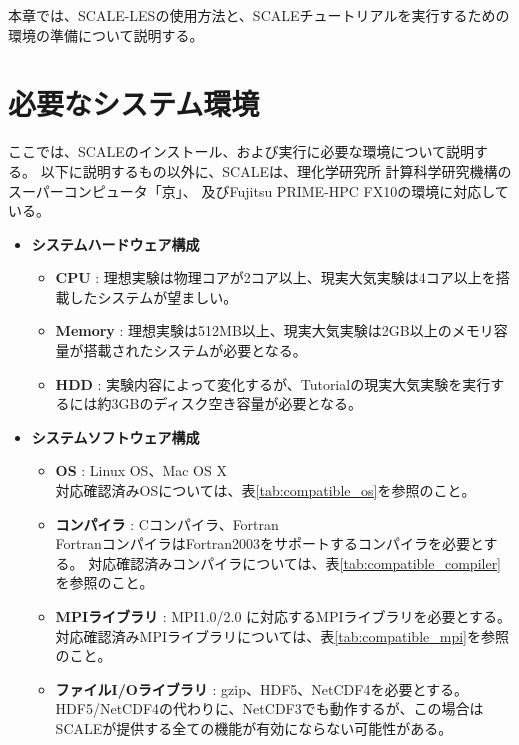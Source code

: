 本章では、SCALE-LESの使用方法と、SCALEチュートリアルを実行するための環境の準備について説明する。

\section{必要なシステム環境}
\label{sec:req_env}
ここでは、SCALEのインストール、および実行に必要な環境について説明する。
以下に説明するもの以外に、SCALEは、理化学研究所 計算科学研究機構のスーパーコンピュータ「京」、
及びFujitsu PRIME-HPC FX10の環境に対応している。

\begin{itemize}
  \item {\bf システムハードウェア構成}
  \begin{itemize}
    \item {\bf CPU} : 理想実験は物理コアが2コア以上、現実大気実験は4コア以上を搭載したシステムが望ましい。
    \item {\bf Memory} : 理想実験は512MB以上、現実大気実験は2GB以上のメモリ容量が搭載されたシステムが必要となる。
    \item {\bf HDD} : 実験内容によって変化するが、Tutorialの現実大気実験を実行するには約3GBのディスク空き容量が必要となる。
  \end{itemize}

  \item {\bf システムソフトウェア構成}
  \begin{itemize}
  \item {\bf OS} : Linux OS、Mac OS X\\
        対応確認済みOSについては、表\ref{tab:compatible_os}を参照のこと。
  \item {\bf コンパイラ} : Cコンパイラ、Fortran\\
        FortranコンパイラはFortran2003をサポートするコンパイラを必要とする。
        対応確認済みコンパイラについては、表\ref{tab:compatible_compiler}を参照のこと。
  \item {\bf MPIライブラリ} : MPI1.0/2.0 に対応するMPIライブラリを必要とする。
        対応確認済みMPIライブラリについては、表\ref{tab:compatible_mpi}を参照のこと。
  \item {\bf ファイルI/Oライブラリ} : gzip、HDF5、NetCDF4を必要とする。\\
        HDF5/NetCDF4の代わりに、NetCDF3でも動作するが、この場合はSCALEが提供する全ての機能が有効にならない可能性がある。
  \end{itemize}
\end{itemize}


